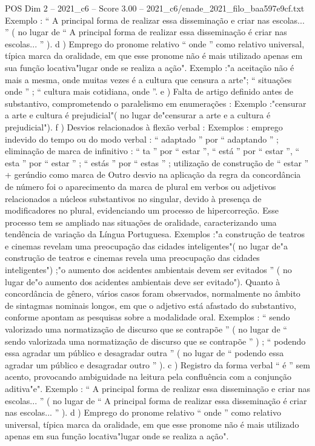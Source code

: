 \begin{textsample}{POS Dim 2 – 2021\_c6 – Score 3.00 – 2021\_c6/enade\_2021\_filo\_baa597e9cf.txt}
Exemplo : “ A principal forma de realizar essa disseminação e criar nas escolas... ” ( no lugar de “ A principal forma de realizar essa disseminação é criar nas escolas... ” ). d ) Emprego do pronome relativo “ onde ” como relativo universal, típica marca da oralidade, em que esse pronome não é mais utilizado apenas em sua função locativa"lugar onde se realiza a ação".
Exemplo :"a aceitação não é mais a mesma, onde muitas vezes é a cultura que censura a arte"; “ situações onde ” ; “ cultura mais cotidiana, onde ”. e ) Falta de artigo definido antes de substantivo, comprometendo o paralelismo em enumerações : Exemplo :"censurar a arte e cultura é prejudicial"( no lugar de"censurar a arte e a cultura é prejudicial"). f ) Desvios relacionados à flexão verbal : Exemplos : emprego indevido do tempo ou do modo verbal : “ adaptado ” por “ adaptando ” ; eliminação de marca de infinitivo : “ ta ” por “ estar ”, “ está ” por “ estar ”, “ esta ” por “ estar ” ; “ estás ” por “ estas ” ; utilização de construção de “ estar ” + gerúndio como marca de Outro desvio na aplicação da regra da concordância de número foi o aparecimento da marca de plural em verbos ou adjetivos relacionados a núcleos substantivos no singular, devido à presença de modificadores no plural, evidenciando um processo de hipercorreção.
Esse processo tem se ampliado nas situações de oralidade, caracterizando uma tendência de variação da Língua Portuguesa.
Exemplos :"a construção de teatros e cinemas revelam uma preocupação das cidades inteligentes"( no lugar de"a construção de teatros e cinemas revela uma preocupação das cidades inteligentes") ;"o aumento dos acidentes ambientais devem ser evitados ” ( no lugar de"o aumento dos acidentes ambientais deve ser evitado").
Quanto à concordância de gênero, vários casos foram observados, normalmente no âmbito de sintagmas nominais longos, em que o adjetivo está afastado do substantivo, conforme apontam as pesquisas sobre a modalidade oral.
Exemplos : “ sendo valorizado uma normatização de discurso que se contrapõe ” ( no lugar de “ sendo valorizada uma normatização de discurso que se contrapõe ” ) ; “ podendo essa agradar um público e desagradar outra ” ( no lugar de “ podendo essa agradar um público e desagradar outro ” ). c ) Registro da forma verbal “ é ” sem acento, provocando ambiguidade na leitura pela confluência com a conjunção aditiva"e".
Exemplo : “ A principal forma de realizar essa disseminação e criar nas escolas... ” ( no lugar de “ A principal forma de realizar essa disseminação é criar nas escolas... ” ). d ) Emprego do pronome relativo “ onde ” como relativo universal, típica marca da oralidade, em que esse pronome não é mais utilizado apenas em sua função locativa"lugar onde se realiza a ação".

\end{textsample}
